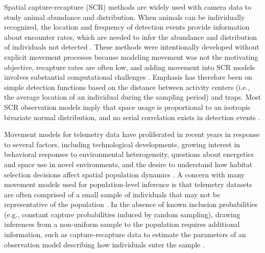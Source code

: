 \documentclass[12pt]{article}
\begin{document}
Spatial capture-recapture (SCR) methods are widely used with camera
data to study animal abundance and distribution. When animals can be
individually recognized, the location and frequency
of detection events provide information about encounter rates, which
are needed to infer the abundance and distribution of individuals not
detected \citep{efford:2004,borchers_efford:2008,royle_etal:2014}.  
These methods were intentionally developed without
explicit movement processes because modeling movement was not the
motivating objective, recapture rates are often low, and adding
movement into SCR models involves substantial computational challenges
\citep{borchers:2012,borchers_etal:2014}. Emphasis has
therefore been on simple detection functions based on the distance
between activity centers (i.e., the average location of an individual
during the sampling period) and traps. Most SCR observation models
imply that space usage is proportional to an isotropic bivariate normal
distribution, and no serial correlation exists in detection events
\citep[but see][for models implying anisotropic home ranges]{royle_etal:2013,royle_etal:2013mee,royle_etal:2016,chandler_etal:2018mee}.

Movement models for telemetry data have proliferated in recent years
in response to several factors, including technological developments,
growing interest in behavioral responses to
environmental heterogeneity, questions about energetics and space use
in novel environments, and the desire to understand how habitat
selection decisions affect spatial population dynamics  
\citep{lima_zollner:1996,turchin:1998,gaillard_etal:2010,clobert_etal:2012,hooten_etal:2019}.
A concern with many movement models used for population-level
inference is that telemetry datasets are often comprised of a small 
sample of individuals that may not be representative of the population 
\citep{fieberg_etal:2010,hanks_etal:2011,fleming_etal:2019}.
In the absence of known inclusion probabilities
(e.g., constant capture probabilities induced by random sampling),
drawing inferences from a non-uniform sample to the population
requires additional information, such as capture-recapture data to
estimate the parameters of an observation model describing how
individuals enter the sample  
\citep{tufto_etal:2012,gurarie_ovaskainen:2013,pedersen_weng:2013,raabe_etal:2014,mcclintock_etal:2021}.
\end{document}
